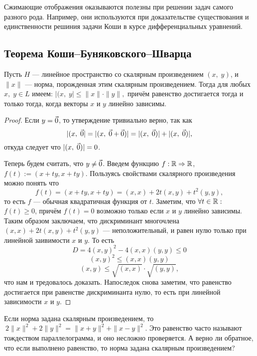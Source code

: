 Сжимающие отображения оказываются полезны при решении задач самого разного рода. Например, они используются при доказательстве существования и единственности решиния задачи Коши в курсе дифференциальных уравнений. 

\subsection{Теорема Коши--Буняковского--Шварца}

\begin{Theorem}
	Пусть $H$ --- линейное пространство со скалярным произведением $(x,\;y)$, и $\|x\|$ --- норма, порожденная этим скалярным произведением.
	Тогда для любых $x,\;y\in L$ имеем: $|( x,\;y | \leqslant \|x\|\cdot\|y\|,$ причём равенство достигается тогда и только тогда, когда векторы $x$ и $y$ линейно зависимы.
\end{Theorem}
\begin{proof}
	Если $y = \vec{0}$, то утверждение тривиально верно, так как $$ |( x,\;\vec{0} | = |( x,\;\vec{0}+\vec{0})| = |( x,\;\vec{0})|+|( x,\;\vec{0})|,$$
	откуда следует что $|( x,\;\vec{0})| = 0$.
	
	Теперь будем считать, что $y\neq \vec{0}$. Введем функцию $f: \mathbb{R} \Rightarrow\mathbb{R}$, $f(t):=(x+ty, x+ty)$. Пользуясь свойствами скалярного произведения можно понять что $$ f(t) =(x+ty, x+ty) = (x, x)+2t(x, y)+t^2(y, y),$$ то есть $f$ --- обычная квадратичная функция от $t$. Заметим, что $\forall t\in\mathbb{R}:$ $f(t)\geq0$, причём $f(t)=0$ возможно только если $x$ и $y$ линейно зависимы. Таким образом заключаем, что дискриминант многочлена $(x, x)+2t(x, y)+t^2(y, y)$ --- неположительный, и равен нулю только при линейной заивимости $x$ и $y$. То есть 
	\[D = 4(x, y)^2-4(x, x)(y, y)\leq 0\]
	\[(x, y)^2\leq(x, x)(y, y)\]
	\[(x, y)\leq \sqrt{(x, x)}\cdot \sqrt{(y, y)},\]
	что нам и тредовалось доказать. Напоследок снова заметим, что равенство достигается при равенстве дискриминанта нулю, то есть при линейной зависимости $x$ и $y$.
\end{proof}
\begin{Task}
	Если норма задана скалярным произведением, то 
	$\ 2\|x\|^2+2\|y\|^2=\|x+y\|^2+\|x-y\|^2$. Это равенство часто называют тождеством параллелограмма, и оно несложно проверяется. А верно ли обратное, что если выполнено равенство, то норма задана скалярным произведением?
\end{Task}
